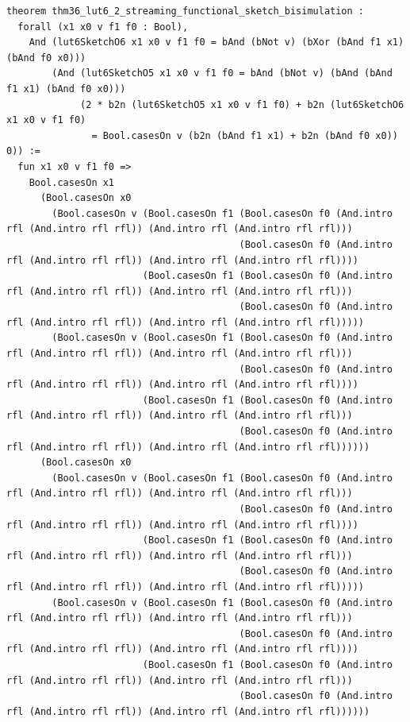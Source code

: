 \documentclass[10pt,twocolumn]{article}
\theoremstyle{spectralthm}
\begin{document}
\begin{lstlisting}[language=Lean4,caption={Standalone Pure Init.Prelude Term-Mode Lean 4 Expansion (thm30--thm37, v1.1.0, 0 sorry, 0 axioms).},label={lst:lean_v110}]
theorem thm36_lut6_2_streaming_functional_sketch_bisimulation :
  forall (x1 x0 v f1 f0 : Bool),
    And (lut6SketchO6 x1 x0 v f1 f0 = bAnd (bNot v) (bXor (bAnd f1 x1) (bAnd f0 x0)))
        (And (lut6SketchO5 x1 x0 v f1 f0 = bAnd (bNot v) (bAnd (bAnd f1 x1) (bAnd f0 x0)))
             (2 * b2n (lut6SketchO5 x1 x0 v f1 f0) + b2n (lut6SketchO6 x1 x0 v f1 f0)
               = Bool.casesOn v (b2n (bAnd f1 x1) + b2n (bAnd f0 x0)) 0)) :=
  fun x1 x0 v f1 f0 =>
    Bool.casesOn x1
      (Bool.casesOn x0
        (Bool.casesOn v (Bool.casesOn f1 (Bool.casesOn f0 (And.intro rfl (And.intro rfl rfl)) (And.intro rfl (And.intro rfl rfl)))
                                         (Bool.casesOn f0 (And.intro rfl (And.intro rfl rfl)) (And.intro rfl (And.intro rfl rfl))))
                        (Bool.casesOn f1 (Bool.casesOn f0 (And.intro rfl (And.intro rfl rfl)) (And.intro rfl (And.intro rfl rfl)))
                                         (Bool.casesOn f0 (And.intro rfl (And.intro rfl rfl)) (And.intro rfl (And.intro rfl rfl)))))
        (Bool.casesOn v (Bool.casesOn f1 (Bool.casesOn f0 (And.intro rfl (And.intro rfl rfl)) (And.intro rfl (And.intro rfl rfl)))
                                         (Bool.casesOn f0 (And.intro rfl (And.intro rfl rfl)) (And.intro rfl (And.intro rfl rfl))))
                        (Bool.casesOn f1 (Bool.casesOn f0 (And.intro rfl (And.intro rfl rfl)) (And.intro rfl (And.intro rfl rfl)))
                                         (Bool.casesOn f0 (And.intro rfl (And.intro rfl rfl)) (And.intro rfl (And.intro rfl rfl))))))
      (Bool.casesOn x0
        (Bool.casesOn v (Bool.casesOn f1 (Bool.casesOn f0 (And.intro rfl (And.intro rfl rfl)) (And.intro rfl (And.intro rfl rfl)))
                                         (Bool.casesOn f0 (And.intro rfl (And.intro rfl rfl)) (And.intro rfl (And.intro rfl rfl))))
                        (Bool.casesOn f1 (Bool.casesOn f0 (And.intro rfl (And.intro rfl rfl)) (And.intro rfl (And.intro rfl rfl)))
                                         (Bool.casesOn f0 (And.intro rfl (And.intro rfl rfl)) (And.intro rfl (And.intro rfl rfl)))))
        (Bool.casesOn v (Bool.casesOn f1 (Bool.casesOn f0 (And.intro rfl (And.intro rfl rfl)) (And.intro rfl (And.intro rfl rfl)))
                                         (Bool.casesOn f0 (And.intro rfl (And.intro rfl rfl)) (And.intro rfl (And.intro rfl rfl))))
                        (Bool.casesOn f1 (Bool.casesOn f0 (And.intro rfl (And.intro rfl rfl)) (And.intro rfl (And.intro rfl rfl)))
                                         (Bool.casesOn f0 (And.intro rfl (And.intro rfl rfl)) (And.intro rfl (And.intro rfl rfl))))))


\end{lstlisting}
\end{document}
